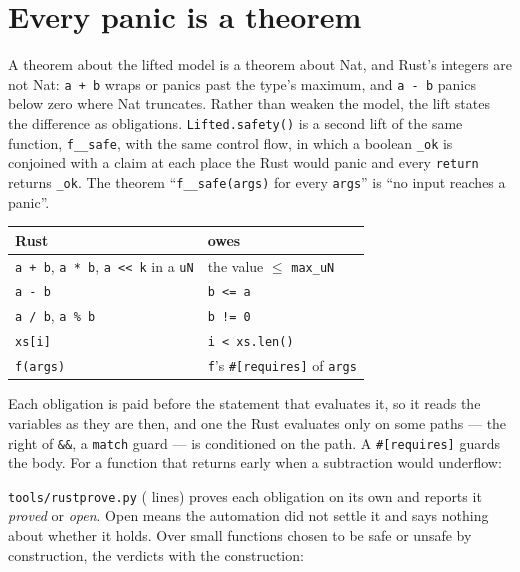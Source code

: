 \documentclass[11pt]{article}
\begin{document}
\section{Every panic is a theorem}\label{sec:safety}

A theorem about the lifted model is a theorem about Nat, and Rust's
integers are not Nat: \texttt{a + b} wraps or panics past the type's
maximum, and \texttt{a - b} panics below zero where Nat truncates.  Rather
than weaken the model, the lift states the difference as obligations.
\texttt{Lifted.safety()} is a second lift of the same function,
\texttt{f\_\_safe}, with the same control flow, in which a boolean
\texttt{\_ok} is conjoined with a claim at each place the Rust would panic
and every \texttt{return} returns \texttt{\_ok}.  The theorem
``\texttt{f\_\_safe(args)} for every \texttt{args}'' is ``no input reaches
a panic''.

\begin{center}
\begin{tabular}{ll}
\toprule
Rust & owes \\
\midrule
\texttt{a + b}, \texttt{a * b}, \texttt{a << k} in a \texttt{uN} & the value $\le$ \texttt{max\_uN} \\
\texttt{a - b} & \texttt{b <= a} \\
\texttt{a / b}, \texttt{a \% b} & \texttt{b != 0} \\
\texttt{xs[i]} & \texttt{i < xs.len()} \\
\texttt{f(args)} & \texttt{f}'s \texttt{\#[requires]} of \texttt{args} \\
\bottomrule
\end{tabular}
\end{center}

Each obligation is paid before the statement that evaluates it, so it reads
the variables as they are then, and one the Rust evaluates only on some
paths --- the right of \texttt{\&\&}, a \texttt{match} guard --- is
conditioned on the path.  A \texttt{\#[requires]} guards the body.  For a
function that returns early when a subtraction would underflow:



\texttt{tools/rustprove.py} (\proveLines{} lines) proves each obligation on
its own and reports it \emph{proved} or \emph{open}.  Open means the
automation did not settle it and says nothing about whether it holds.  Over
\safetyShapes{} small functions chosen to be safe or unsafe by construction,
the verdicts \safetyAgrees{} with the construction:
\end{document}
